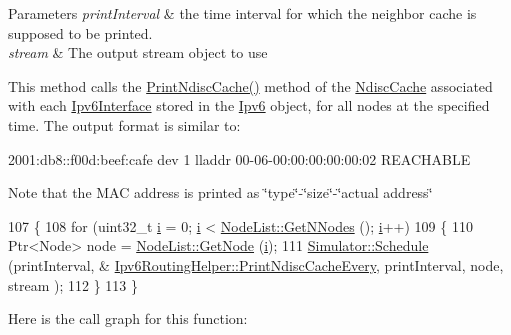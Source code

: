\begin{DoxyParams}{Parameters}
{\em print\+Interval} & the time interval for which the neighbor cache is supposed to be printed. \\
\hline
{\em stream} & The output stream object to use\\
\hline
\end{DoxyParams}
This method calls the \hyperlink{classns3_1_1Ipv6RoutingHelper_a582eac0a7c42f77cdc5b8319f1c25897}{Print\+Ndisc\+Cache()} method of the \hyperlink{classns3_1_1NdiscCache}{Ndisc\+Cache} associated with each \hyperlink{classns3_1_1Ipv6Interface}{Ipv6\+Interface} stored in the \hyperlink{classns3_1_1Ipv6}{Ipv6} object, for all nodes at the specified time. The output format is similar to\+: \begin{DoxyVerb}2001:db8::f00d:beef:cafe dev 1 lladdr 00-06-00:00:00:00:00:02 REACHABLE
\end{DoxyVerb}
 Note that the M\+AC address is printed as \char`\"{}type\char`\"{}-\/\char`\"{}size\char`\"{}-\/\char`\"{}actual address\char`\"{} 
\begin{DoxyCode}
107 \{
108   \textcolor{keywordflow}{for} (uint32\_t \hyperlink{bernuolliDistribution_8m_a6f6ccfcf58b31cb6412107d9d5281426}{i} = 0; \hyperlink{bernuolliDistribution_8m_a6f6ccfcf58b31cb6412107d9d5281426}{i} < \hyperlink{classns3_1_1NodeList_a1d110b1670005895dd5812baab13682a}{NodeList::GetNNodes} (); \hyperlink{bernuolliDistribution_8m_a6f6ccfcf58b31cb6412107d9d5281426}{i}++)
109     \{
110       Ptr<Node> node = \hyperlink{classns3_1_1NodeList_a80ac09977d48d29db5c704ac8483cf6c}{NodeList::GetNode} (\hyperlink{bernuolliDistribution_8m_a6f6ccfcf58b31cb6412107d9d5281426}{i});
111       \hyperlink{classns3_1_1Simulator_a671882c894a08af4a5e91181bf1eec13}{Simulator::Schedule} (printInterval, &
      \hyperlink{classns3_1_1Ipv6RoutingHelper_a6b83234c9aa93f14576ba9f12c87a64b}{Ipv6RoutingHelper::PrintNdiscCacheEvery}, printInterval, node, stream
      );
112     \}
113 \}
\end{DoxyCode}


Here is the call graph for this function\+:


